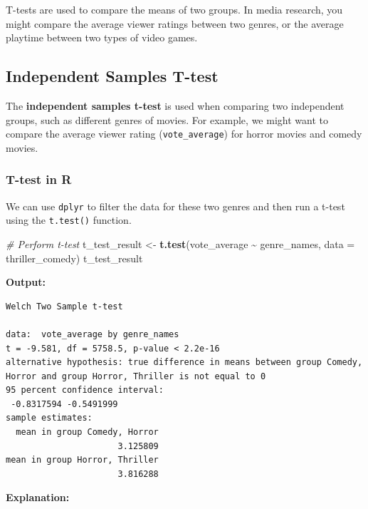 \documentclass[
]{book}
\newenvironment{Shaded}{\begin{snugshade}}{\end{snugshade}}
\newcommand{\AttributeTok}[1]{\textcolor[rgb]{0.13,0.29,0.53}{#1}}
\newcommand{\CommentTok}[1]{\textcolor[rgb]{0.56,0.35,0.01}{\textit{#1}}}
\newcommand{\FunctionTok}[1]{\textcolor[rgb]{0.13,0.29,0.53}{\textbf{#1}}}
\newcommand{\NormalTok}[1]{#1}
\newcommand{\OtherTok}[1]{\textcolor[rgb]{0.56,0.35,0.01}{#1}}
\newcommand{\SpecialCharTok}[1]{\textcolor[rgb]{0.81,0.36,0.00}{\textbf{#1}}}
\begin{document}
T-tests are used to compare the means of two groups. In media research, you might compare the average viewer ratings between two genres, or the average playtime between two types of video games.

\subsection*{Independent Samples T-test}\label{independent-samples-t-test}

The \textbf{independent samples t-test} is used when comparing two independent groups, such as different genres of movies. For example, we might want to compare the average viewer rating (\texttt{vote\_average}) for horror movies and comedy movies.

\subsubsection*{T-test in R}\label{t-test-in-r}

We can use \texttt{dplyr} to filter the data for these two genres and then run a t-test using the \texttt{t.test()} function.

\begin{Shaded}
\begin{Highlighting}[]
\CommentTok{\# Perform t{-}test}
\NormalTok{t\_test\_result }\OtherTok{\textless{}{-}} \FunctionTok{t.test}\NormalTok{(vote\_average }\SpecialCharTok{\textasciitilde{}}\NormalTok{ genre\_names, }\AttributeTok{data =}\NormalTok{ thriller\_comedy)}
\NormalTok{t\_test\_result}
\end{Highlighting}
\end{Shaded}

\textbf{Output:}

\begin{verbatim}
Welch Two Sample t-test

data:  vote_average by genre_names
t = -9.581, df = 5758.5, p-value < 2.2e-16
alternative hypothesis: true difference in means between group Comedy, Horror and group Horror, Thriller is not equal to 0
95 percent confidence interval:
 -0.8317594 -0.5491999
sample estimates:
  mean in group Comedy, Horror 
                      3.125809 
mean in group Horror, Thriller 
                      3.816288 
\end{verbatim}

\textbf{Explanation:}
\end{document}
